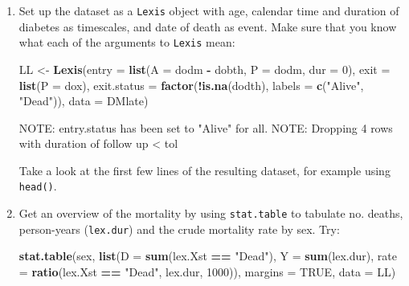 \documentclass[
]{book}
\newenvironment{Shaded}{\begin{snugshade}}{\end{snugshade}}
\newcommand{\AttributeTok}[1]{\textcolor[rgb]{0.13,0.29,0.53}{#1}}
\newcommand{\ConstantTok}[1]{\textcolor[rgb]{0.56,0.35,0.01}{#1}}
\newcommand{\DecValTok}[1]{\textcolor[rgb]{0.00,0.00,0.81}{#1}}
\newcommand{\FunctionTok}[1]{\textcolor[rgb]{0.13,0.29,0.53}{\textbf{#1}}}
\newcommand{\NormalTok}[1]{#1}
\newcommand{\OtherTok}[1]{\textcolor[rgb]{0.56,0.35,0.01}{#1}}
\newcommand{\SpecialCharTok}[1]{\textcolor[rgb]{0.81,0.36,0.00}{\textbf{#1}}}
\newcommand{\StringTok}[1]{\textcolor[rgb]{0.31,0.60,0.02}{#1}}
\begin{document}
\begin{enumerate}
\def\labelenumi{\arabic{enumi}.}
\item
  Set up the dataset as a \texttt{Lexis} object with age, calendar
  time and duration of diabetes as timescales, and date of death as
  event. Make sure that you know what each of the arguments to
  \texttt{Lexis} mean:

\begin{Shaded}
\begin{Highlighting}[]
\NormalTok{LL }\OtherTok{\textless{}{-}} \FunctionTok{Lexis}\NormalTok{(}\AttributeTok{entry =} \FunctionTok{list}\NormalTok{(}\AttributeTok{A =}\NormalTok{ dodm }\SpecialCharTok{{-}}\NormalTok{ dobth, }
                         \AttributeTok{P =}\NormalTok{ dodm, }
                       \AttributeTok{dur =} \DecValTok{0}\NormalTok{),}
             \AttributeTok{exit =} \FunctionTok{list}\NormalTok{(}\AttributeTok{P =}\NormalTok{ dox),}
      \AttributeTok{exit.status =} \FunctionTok{factor}\NormalTok{(}\SpecialCharTok{!}\FunctionTok{is.na}\NormalTok{(dodth), }
                           \AttributeTok{labels =} \FunctionTok{c}\NormalTok{(}\StringTok{"Alive"}\NormalTok{, }\StringTok{"Dead"}\NormalTok{)),}
             \AttributeTok{data =}\NormalTok{ DMlate)}
\end{Highlighting}
\end{Shaded}

\begin{Shaded}
\begin{Highlighting}[]
\NormalTok{NOTE: entry.status has been set to "Alive" for all.}
\NormalTok{NOTE: Dropping  4  rows with duration of follow up \textless{} tol}
\end{Highlighting}
\end{Shaded}

  Take a look at the first few lines of the resulting dataset, for
  example using \texttt{head()}.
\item
  Get an overview of the mortality by using \texttt{stat.table}
  to tabulate no. deaths, person-years (\texttt{lex.dur}) and the
  crude mortality rate by sex. Try:

\begin{Shaded}
\begin{Highlighting}[]
\FunctionTok{stat.table}\NormalTok{(sex,}
           \FunctionTok{list}\NormalTok{(}\AttributeTok{D =} \FunctionTok{sum}\NormalTok{(lex.Xst }\SpecialCharTok{==} \StringTok{"Dead"}\NormalTok{),}
                \AttributeTok{Y =} \FunctionTok{sum}\NormalTok{(lex.dur),}
             \AttributeTok{rate =} \FunctionTok{ratio}\NormalTok{(lex.Xst }\SpecialCharTok{==} \StringTok{"Dead"}\NormalTok{, }
\NormalTok{                          lex.dur, }
                          \DecValTok{1000}\NormalTok{)),}
          \AttributeTok{margins =} \ConstantTok{TRUE}\NormalTok{,}
             \AttributeTok{data =}\NormalTok{ LL)}
\end{Highlighting}
\end{Shaded}


\end{enumerate}
\end{document}
